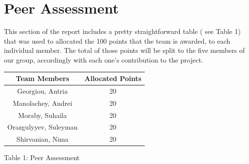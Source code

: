 \documentclass[11pt,a4paper]{article}
\begin{document}
\section{Peer Assessment}
This section of the report includes a pretty straightforward table ( see Table 1)  that was used to allocated the 100 points that the team is awarded, to each individual member. The total of those points will be split to the five members of our group, accordingly with each one’s contribution to the project.\newline

\begin{tabular}{||c c||}
    \hline
    Team Members & Allocated Points \\ [0.5ex]
    \hline \hline
    Georgiou, Antria & 20 \\
    \hline
    Manolachey, Andrei & 20 \\
    \hline
    Moraby, Suhaila & 20 \\
    \hline
    Orazgulyyev, Suleyman & 20 \\
    \hline
    Shirvanian, Nima & 20 \\[1ex]
    \hline
\end{tabular}

Table 1: Peer Assessment
\end{document}
